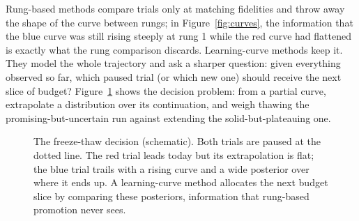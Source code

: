 Rung-based methods compare trials only at matching fidelities and throw
away the shape of the curve between rungs; in Figure~\ref{fig:curves},
the information that the blue curve was still rising steeply at rung 1
while the red curve had flattened is exactly what the rung comparison
discards. Learning-curve methods keep it. They model the whole
trajectory and ask a sharper question: given everything observed so far,
which paused trial (or which new one) should receive the next slice of
budget? Figure~\ref{fig:freezethaw} shows the decision problem: from a
partial curve, extrapolate a distribution over its continuation, and
weigh thawing the promising-but-uncertain run against extending the
solid-but-plateauing one.

\begin{figure}[t]
\centering
{}
\caption{The freeze-thaw decision (schematic). Both trials are paused at
the dotted line. The red trial leads today but its extrapolation is
flat; the blue trial trails with a rising curve and a wide posterior
over where it ends up. A learning-curve method allocates the next budget
slice by comparing these posteriors, information that rung-based
promotion never sees.}
\label{fig:freezethaw}
\end{figure}

